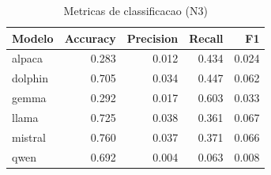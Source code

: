 \begin{table}[ht]
  \centering
  \caption{Metricas de classificacao (N3)}
  \label{tab:results_n3_classification}
  \begin{tabular}{lrrrr}
    \toprule
    Modelo & Accuracy & Precision & Recall & F1 \\
    \midrule
    alpaca & 0.283 & 0.012 & 0.434 & 0.024 \\
    dolphin & 0.705 & 0.034 & 0.447 & 0.062 \\
    gemma & 0.292 & 0.017 & 0.603 & 0.033 \\
    llama & 0.725 & 0.038 & 0.361 & 0.067 \\
    mistral & 0.760 & 0.037 & 0.371 & 0.066 \\
    qwen & 0.692 & 0.004 & 0.063 & 0.008 \\
    \bottomrule
  \end{tabular}
\end{table}
